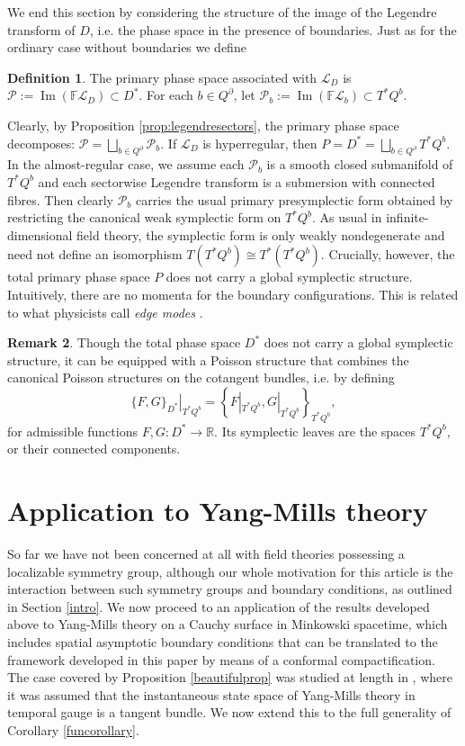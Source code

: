 \documentclass{article}
\newcommand{\R}{\mathbb{R}}
\theoremstyle{definition}
\newtheorem{definition}{Definition}[section]
\newtheorem{remark}[definition]{Remark}
\begin{document}
We end this section by considering the structure of the image of the Legendre transform of $D$, i.e. the phase space in the presence of boundaries. Just as for the ordinary case without boundaries we define
\begin{definition}
The primary phase space associated with \(\mathcal L_D\) is $\mathcal{P}:=\operatorname{Im}(\mathbb F\mathcal L_D)\subset D^*$.
For each \(b\in Q^\partial\), let $\mathcal{P}_b:=\operatorname{Im}(\mathbb F\mathcal L_b)
\subset T^*Q^b$.
\end{definition}
Clearly, by Proposition \ref{prop:legendresectors}, the primary phase space decomposes: $\mathcal P=\bigsqcup_{b\in Q^\partial}\mathcal{P}_b$.
If \(\mathcal L_D\) is hyperregular, then $P=D^*
=
\bigsqcup_{b\in Q^\partial}T^*Q^b$.
In the almost-regular case, we assume each \(\mathcal{P}_b\) is a smooth closed submanifold of \(T^*Q^b\) and each sectorwise Legendre transform is a submersion with connected fibres. Then clearly \(\mathcal{P}_b\) carries the usual primary presymplectic form obtained by restricting the canonical weak symplectic form on \(T^*Q^b\). As usual in infinite-dimensional field theory, the symplectic form is only weakly
nondegenerate and need not define
an isomorphism \(T(T^*Q^b)\cong T^*(T^*Q^b)\). Crucially, however, the total primary phase space $P$ does not carry a global symplectic structure. Intuitively, there are no momenta for the boundary configurations. This is related to what physicists call \textit{edge modes} \cite{donnellyLocalSubsystemsGauge2016a,rielloEdgeModesEdge2021}.

\begin{remark}
Though the total phase space $D^*$ does not carry a global symplectic structure, it can be equipped with a Poisson structure that combines the canonical Poisson structures on the cotangent bundles, i.e. by defining
\[
\left.\{F,G\}_{D^*}\right|_{T^*Q^b}
=
\left\{
F|_{T^*Q^b},
G|_{T^*Q^b}
\right\}_{T^*Q^b},
\]
for admissible functions $F,G\colon D^*\to\R$. Its symplectic leaves are the spaces \(T^*Q^b\), or their connected components.
\end{remark}


\section{Application to Yang-Mills theory}\label{sec:YM}


So far we have not been concerned at all with field theories possessing a localizable symmetry group, although our whole motivation for this article is the interaction between such symmetry groups and boundary conditions, as outlined in Section \ref{intro}. We now proceed to an application of the results developed above to Yang-Mills theory on a Cauchy surface in Minkowski spacetime, which includes spatial asymptotic boundary conditions that can be translated to the framework developed in this paper by means of a conformal compactification. The case covered by Proposition \ref{beautifulprop} was studied at length in \cite{Borsboom:2025agn}, where it was assumed that the instantaneous state space of Yang-Mills theory in temporal gauge is a tangent bundle. We now extend this to the full generality of Corollary \ref{funcorollary}.
\end{document}
